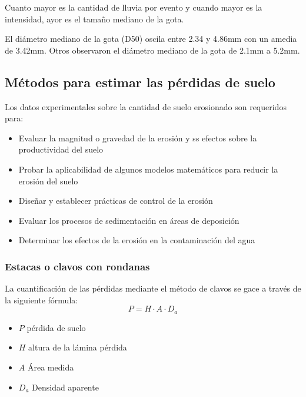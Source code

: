     Cuanto mayor es la cantidad de lluvia por evento y cuando mayor es la intensidad, ayor es el tamaño mediano de la gota.
    
    El diámetro mediano de la gota (D50) oscila entre 2.34 y 4.86mm con un amedia de 3.42mm. Otros observaron el diámetro mediano de la gota de 2.1mm a 5.2mm.
    \subsection{Métodos para estimar las pérdidas de suelo}
    Los datos experimentales sobre la cantidad de suelo erosionado son requeridos para:
    \begin{itemize}
        \item Evaluar la magnitud o gravedad de la erosión y ss efectos sobre la productividad del suelo 
        \item Probar la aplicabilidad de algunos modelos matemáticos para reducir la erosión del suelo
        \item Diseñar y establecer prácticas de control de la erosión
        \item Evaluar los procesos de sedimentación en áreas de deposición
        \item Determinar los efectos de la erosión en la contaminación del agua
    \end{itemize}
    \subsubsection{Estacas o clavos con rondanas}
    La cuantificación de las pérdidas mediante el método de clavos se gace a través de la siguiente fórmula:
    \begin{equation}
        P = H \cdot A \cdot D_a
    \end{equation}
    \begin{notation}
    \begin{itemize}
        \item $P$ pérdida de suelo
        \item $H$ altura de la lámina pérdida
        \item $A$ Área medida
        \item $D_a$ Densidad aparente
    \end{itemize}
\end{notation}
